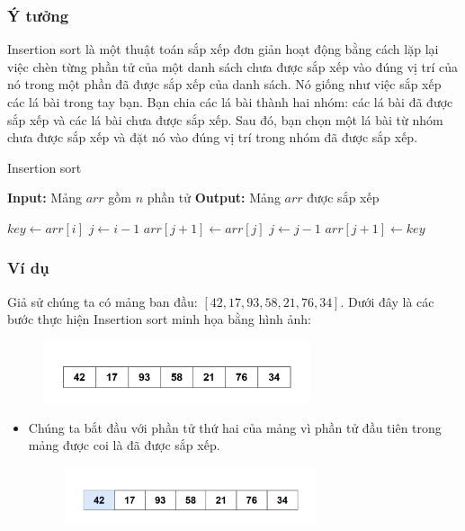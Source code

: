 \subsubsection{Ý tưởng}
Insertion sort là một thuật toán sắp xếp đơn giản hoạt động bằng cách lặp lại việc chèn từng phần tử của một danh sách chưa được sắp xếp vào đúng vị trí của nó trong một phần đã được sắp xếp của danh sách. Nó giống như việc sắp xếp các lá bài trong tay bạn. Bạn chia các lá bài thành hai nhóm: các lá bài đã được sắp xếp và các lá bài chưa được sắp xếp. Sau đó, bạn chọn một lá bài từ nhóm chưa được sắp xếp và đặt nó vào đúng vị trí trong nhóm đã được sắp xếp. \cite{smith2022insertion} \cite{doe2022insertion}
\begin{algorithm}[H]
\caption{Insertion sort}
\begin{algorithmic}[1]
    \State \textbf{Input:} Mảng $arr$ gồm $n$ phần tử
    \State \textbf{Output:} Mảng $arr$ được sắp xếp
    
    \State $key \gets arr[i]$
    \State $j \gets i - 1$
        \State $arr[j+1] \gets arr[j]$
        \State $j \gets j - 1$
    \EndWhile
    \State $arr[j+1] \gets key$
\EndFor
\EndProcedure
\end{algorithmic}
\end{algorithm}

\subsubsection{Ví dụ}
Giả sử chúng ta có mảng ban đầu: $[42, 17, 93, 58, 21, 76, 34]$. Dưới đây là các bước thực hiện Insertion sort minh họa bằng hình ảnh:


\begin{figure}[H]
    \centering
    \includegraphics[width=0.7\textwidth]{img/inssertion sort/1.png}
    
\end{figure}
\newpage

\begin{itemize}
    \item Chúng ta bắt đầu với phần tử thứ hai của mảng vì phần tử đầu tiên trong mảng được coi là đã được sắp xếp.
    \begin{figure}[H]
        \centering
        \includegraphics[width=0.7\textwidth]{img/inssertion sort/2.png}

    \end{figure}
    
\end{itemize}


